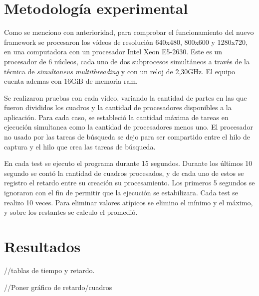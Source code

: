 
\section{Metodología experimental}

Como se menciono con anterioridad, para comprobar el funcionamiento del nuevo
framework se procesaron los vídeos de resolución 640x480, 800x600 y 1280x720, en
una computadora con un procesador Intel Xeon E5-2630. Este es un procesador de
6 núcleos, cada uno de dos subprocesos simultáneos a través de la técnica de
\emph{simultaneus multithreading} y con un reloj de 2,30GHz. El equipo cuenta
ademas con 16GiB de memoria ram.

Se realizaron pruebas con cada vídeo, variando la cantidad de partes en las que
fueron divididos los cuadros y la cantidad de procesadores disponibles a la
aplicación. Para cada caso, se estableció la cantidad máxima de tareas en
ejecución simultanea como la cantidad de procesadores menos uno. El procesador
no usado por las tareas de búsqueda se dejo para ser compartido entre el hilo
de captura y el hilo que crea las tareas de búsqueda.

En cada test se ejecuto el programa durante 15 segundos. Durante los
últimos 10 segundo se contó la cantidad de cuadros procesados, y de cada uno de
estos se registro el retardo entre su creación su procesamiento. Los primeros 5
segundos se ignoraron con el fin de permitir que la ejecución se estabilizara.
Cada test se realizo 10 veces. Para eliminar valores atípicos se elimino el
mínimo y el máximo, y sobre los restantes se calculo el promedió.

\section{Resultados}

//tablas de tiempo y retardo.

//Poner gráfico de retardo/cuadros
